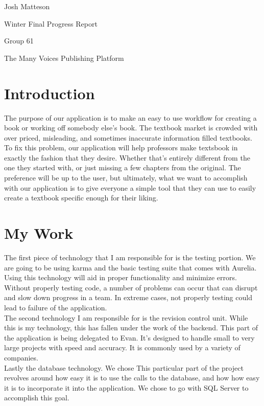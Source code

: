 \documentclass[onecolumn, draftclsnofoot,10pt, compsoc]{IEEEtran}
\begin{document}
\noindent Josh Matteson

\noindent Winter Final Progress Report

\noindent Group 61

\noindent The Many Voices Publishing Platform


\section{Introduction}

The purpose of our application is to make an easy to use workflow for creating a book or working 
off somebody else's book. The textbook market is crowded with over priced, misleading, and sometimes 
inaccurate information filled textbooks. To fix this problem, our application will help professors 
make textsbook in exactly the fashion that they desire. Whether that's entirely different from the 
one they started with, or just missing a few chapters from the original. The preference will be up 
to the user, but ultimately, what we want to accomplish with our application is to give everyone 
a simple tool that they can use to easily create a textbook specific enough for their liking. \\

\section{My Work}

The first piece of technology that I am responsible for is the testing portion. We are going to be using karma and the basic testing 
suite that comes with Aurelia. Using this technology will aid in proper functionality and minimize errors. Without properly testing 
code, a number of problems can occur that can disrupt and slow down progress in a team. In extreme cases, not properly testing could 
lead to failure of the application. \\

The second technology I am responsible for is the revision control unit. While this is my technology, this has fallen under the work 
of the backend. This part of the application is being delegated to Evan. It's designed to handle small to very large projects with speed and accuracy.
It is commonly used by a variety of companies. \\

Lastly the database technology. We chose This particular part of the project revolves around how easy it is to use the calls to the database, and how 
how easy it is to incorporate it into the application. We chose to go with SQL Server to accomplish this goal. \\
\end{document}
